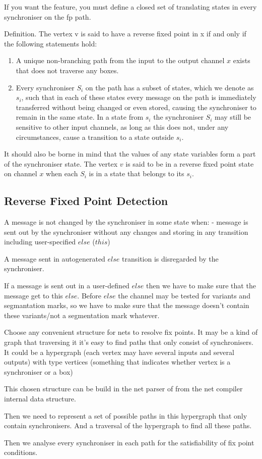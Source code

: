 If you want the feature, you must define a closed set of translating states in every synchroniser on the fp path.


Definition. The vertex v is said to have a reverse fixed point in x if and only if the following statements hold:

\begin{enumerate}
\item A unique non-branching path from the input to the output channel $x$ exists that does not traverse any boxes.

\item Every synchroniser $S_i$ on the path has a subset of states, which we denote as $s_i$, such that in each of these states every message on the path is immediately transferred without being changed or even stored, causing the synchroniser to remain in the same state. In a state from $s_i$ the synchroniser $S_i$ may still be sensitive to other input channels, as long as this does not, under any circumstances, cause a transition to a state outside $s_i$.
\end{enumerate}

It should also be borne in mind that the values of any state variables form a part of the synchroniser state.
The vertex $v$ is said to be in a reverse fixed point state on channel $x$ when each $S_i$ is in a state that belongs to its $s_i$.


    \subsection{Reverse Fixed Point Detection\label{rfp_detect}}
A message is not changed by the synchroniser in some state when:
- message is sent out by the synchroniser without any changes and storing in any transition including user-specified $else$ ($this$)

A message sent in autogenerated $else$ transition is disregarded by the synchroniser.

If a message is sent out in a user-defined $else$ then we have to make sure that the message get to this $else$. Before $else$ the channel may be tested for variants and segmantation marks, so we have to make sure that the message doesn't contain these variants/not a segmentation mark whatever.


Choose any convenient structure for nets to resolve fix points. It may be a kind of graph that traversing it it's easy to find paths that only consist of synchronisers.
It could be a hypergraph (each vertex may have several inputs and several outputs) with type vertices (something that indicates whether vertex is a synchroniser or a box)

This chosen structure can be build in the net parser of from the net compiler internal data structure.

Then we need to represent a set of possible paths in this hypergraph that only contain synchronisers. And a traversal of the hypergraph to find all these paths.

Then we analyse every synchroniser in each path for the satisfiability of fix point conditions.

